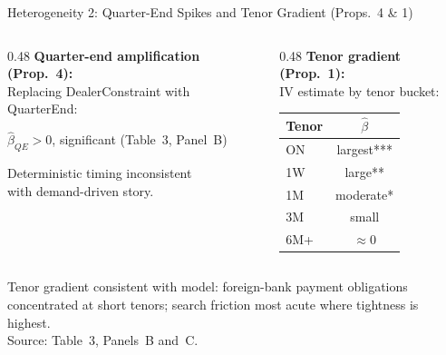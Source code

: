\documentclass[aspectratio=169, 10pt]{beamer}
\begin{document}
\begin{frame}{Heterogeneity 2: Quarter-End Spikes and Tenor Gradient (Props.~4 \& 1)}

  \begin{columns}
    \begin{column}{0.48\textwidth}
      \textbf{Quarter-end amplification (Prop.~4):}\\[0.3em]
      Replacing DealerConstraint with QuarterEnd:

      \medskip
      $\hat\beta_{QE} > 0$, significant (Table~3, Panel~B)

      \medskip
      {\color{dimgray}\small
        Deterministic timing inconsistent\\
        with demand-driven story.}
    \end{column}
    \begin{column}{0.48\textwidth}
      \textbf{Tenor gradient (Prop.~1):}\\[0.3em]
      IV estimate by tenor bucket:

      \medskip
      \begin{tabular}{lc}
        \toprule
        Tenor & $\hat\beta$ \\
        \midrule
        ON & largest*** \\
        1W & large** \\
        1M & moderate* \\
        3M & small \\
        6M+ & $\approx 0$ \\
        \bottomrule
      \end{tabular}
    \end{column}
  \end{columns}

  \bigskip

  {\color{dimgray}\small
    Tenor gradient consistent with model: foreign-bank payment obligations concentrated
    at short tenors; search friction most acute where tightness is highest.\\
    Source: Table~3, Panels~B and~C.}

\end{frame}
\end{document}
